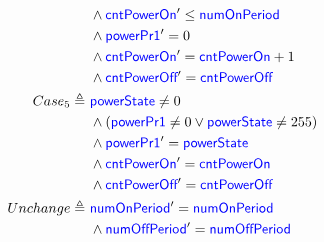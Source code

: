 \documentclass[fleqn,a4paper]{article}
\newcommand\Var[1]{\textcolor{blue}{\textsf{#1}}}
\newcommand\definedby{\triangleq}
\begin{document}
\begin{description}
\begin{align*}
& \wedge \Var{cntPowerOn}' \leq \Var{numOnPeriod} \\
& \wedge \Var{powerPr1}' = 0 \\
& \wedge \Var{cntPowerOn}' = \Var{cntPowerOn} + 1 \\
& \wedge \Var{cntPowerOff}' = \Var{cntPowerOff} \\
Case_5 \definedby \
& \Var{powerState}\neq 0 \\
& \wedge (\Var{powerPr1} \neq 0 \vee \Var{powerState} \neq 255) \\
& \wedge \Var{powerPr1}' = \Var{powerState} \\
& \wedge \Var{cntPowerOn}' = \Var{cntPowerOn} \\
& \wedge \Var{cntPowerOff}' = \Var{cntPowerOff} \\
Unchange \definedby \
& \Var{numOnPeriod}' = \Var{numOnPeriod} \\
& \wedge \Var{numOffPeriod}' = \Var{numOffPeriod}
\end{align*}

\end{description}
\end{document}
